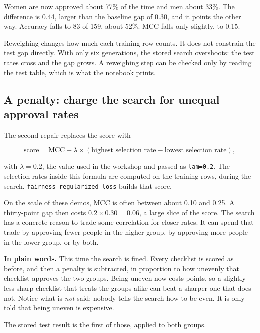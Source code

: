 \documentclass[11pt]{article}
\newcommand{\fn}[1]{\texttt{\small #1}}
\newcommand{\pct}[1]{\mbox{#1\%}}
\begin{document}
Women are now approved about \pct{77} of the time and men about \pct{33}. The difference is 0.44, larger than the baseline gap of 0.30, and it points the other way. Accuracy falls to 83 of 159, about \pct{52}. MCC falls only slightly, to 0.15.

\begin{idea}
Reweighing changes how much each training row counts. It does not constrain the test gap directly. With only six generations, the stored search overshoots: the test rates cross and the gap grows. A reweighing step can be checked only by reading the test table, which is what the notebook prints.
\end{idea}

\subsection{A penalty: charge the search for unequal approval rates}

The second repair replaces the score with

\[
\mathrm{score}
=
\mathrm{MCC}
-
\lambda
\times
(\text{highest selection rate} - \text{lowest selection rate}),
\]

with \(\lambda = 0.2\), the value used in the workshop and passed as \fn{lam=0.2}. The selection rates inside this formula are computed on the training rows, during the search. \fn{fairness\_regularized\_loss} builds that score.

On the scale of these demos, MCC is often between about 0.10 and 0.25. A thirty-point gap then costs \(0.2 \times 0.30 = 0.06\), a large slice of the score. The search has a concrete reason to trade some correlation for closer rates. It can spend that trade by approving fewer people in the higher group, by approving more people in the lower group, or by both.

\begin{plainwords}
\textbf{In plain words.} This time the search is fined. Every checklist is scored as before, and then a penalty is subtracted, in proportion to how unevenly that checklist approves the two groups. Being uneven now costs points, so a slightly less sharp checklist that treats the groups alike can beat a sharper one that does not. Notice what is \emph{not} said: nobody tells the search how to be even. It is only told that being uneven is expensive.
\end{plainwords}

The stored test result is the first of those, applied to both groups.
\end{document}

